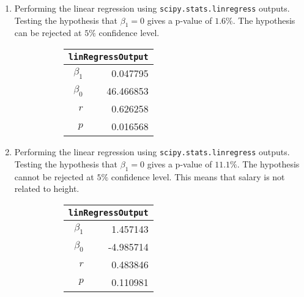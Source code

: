 \begin{enumerate}
\item Performing the linear regression using \texttt{scipy.stats.linregress} outputs. \\
Testing the hypothesis that $ \beta_1 = 0 $ gives a p-value of $ 1.6\% $. The hypothesis can be rejected at $ 5\% $ confidence level.\\


\begin{figure}[H]
	\begin{subfigure}[]{0.2\linewidth}
		\centering
		\begin{tabular}{@{}rr@{}}
			\toprule
			\multicolumn{2}{c}{\texttt{linRegressOutput}} \\
			\midrule
			$\beta_1$     &         0.047795 \\
			$\beta_0$ &        46.466853 \\
			$r$    &         0.626258 \\
			$p$    &         0.016568 \\
			\bottomrule
		\end{tabular}
		
	\end{subfigure}
	\begin{subfigure}[]{0.8\linewidth}
		\centering
		
	\end{subfigure}
\end{figure}

\item Performing the linear regression using \texttt{scipy.stats.linregress} outputs. \\
Testing the hypothesis that $ \beta_1 = 0 $ gives a p-value of $ 11.1\% $. The hypothesis cannot be rejected at $ 5\% $ confidence level. This means that salary is not related to height.\\

\begin{figure}[H]
	\begin{subfigure}[]{0.2\linewidth}
		\centering
		\begin{tabular}{@{}rr@{}}
			\toprule
			\multicolumn{2}{c}{\texttt{linRegressOutput}} \\
			\midrule
			$\beta_1$     &         1.457143 \\
			$\beta_0$ &        -4.985714 \\
			$r$    &         0.483846 \\
			$p$    &         0.110981 \\
			\bottomrule
		\end{tabular}
		

\end{subfigure}
\end{figure}
\end{enumerate}
